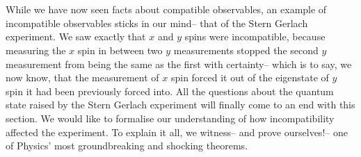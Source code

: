 \\\\
While we have now seen facts about compatible observables, an example of incompatible observables sticks in our mind-- that of the Stern Gerlach experiment. We saw exactly that $x$ and $y$ spins were incompatible, because measuring the $x$ spin in between two $y$ measurements stopped the second $y$ measurement from being the same as the first with certainty-- which is to say, we now know, that the measurement of $x$ spin forced it out of the eigenstate of $y$ spin it had been previously forced into. All the questions about the quantum state raised by the Stern Gerlach experiment will finally come to an end with this section. We would like to formalise our understanding of how incompatibility affected the experiment. To explain it all, we witness-- and prove ourselves!-- one of Physics' most groundbreaking and shocking theorems.
